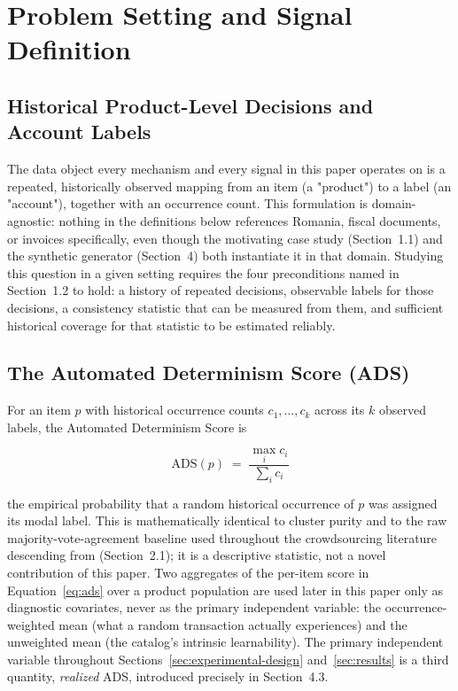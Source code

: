 \documentclass[11pt]{article}
\begin{document}
\section{Problem Setting and Signal Definition}
\label{sec:problem-setting}

\subsection{Historical Product-Level Decisions and Account Labels}
\label{sec:historical-decisions}

The data object every mechanism and every signal in this paper operates on
is a repeated, historically observed mapping from an item (a "product")
to a label (an "account"), together with an occurrence count. This
formulation is domain-agnostic: nothing in the definitions below references
Romania, fiscal documents, or invoices specifically, even though the
motivating case study (Section~1.1) and the synthetic generator (Section~4)
both instantiate it in that domain. Studying this question in a given setting
requires the four preconditions named in Section~1.2 to hold: a history of
repeated decisions, observable labels for those decisions, a consistency
statistic that can be measured from them, and sufficient historical coverage
for that statistic to be estimated reliably.

\subsection{The Automated Determinism Score (ADS)}
\label{sec:ads-definition}

For an item $p$ with historical occurrence counts $c_1,\dots,c_k$ across its
$k$ observed labels, the Automated Determinism Score is

\begin{equation}
\label{eq:ads}
\mathrm{ADS}(p) \;=\; \frac{\max_i c_i}{\sum_i c_i}
\end{equation}

the empirical probability that a random historical occurrence of $p$ was
assigned its modal label. This is mathematically identical to cluster purity
\citep{manning2008,amigo2009} and to the raw majority-vote-agreement
baseline used throughout the crowdsourcing literature descending from
\citet{dawidskene1979} (Section~2.1); it is a descriptive statistic, not a
novel contribution of this paper. Two aggregates of the per-item score in
Equation~\eqref{eq:ads} over a product
population are used later in this paper only as diagnostic covariates, never
as the primary independent variable: the occurrence-weighted mean (what a
random transaction actually experiences) and the unweighted mean (the
catalog's intrinsic learnability). The primary independent variable
throughout Sections~\ref{sec:experimental-design} and~\ref{sec:results} is a third quantity, \emph{realized} ADS,
introduced precisely in Section~4.3.
\end{document}
